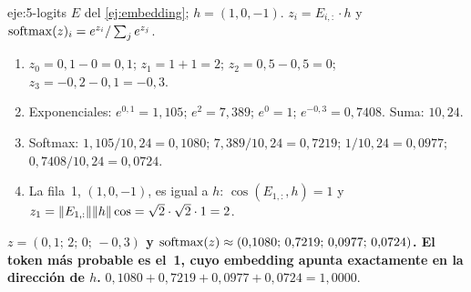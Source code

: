 \begin{solucion}{eje:5-logits}
\datos $E$ del \cref{ej:embedding}; $h=(1,0,-1)$.
\planteamiento $z_i=E_{i,:}\cdot h$ y $\operatorname{softmax}(z)_i=e^{z_i}/\sum_je^{z_j}$.
\pasos
\begin{enumerate}[label=\arabic*.]
  \item $z_0=0{,}1-0=0{,}1$; $z_1=1+1=2$; $z_2=0{,}5-0{,}5=0$; $z_3=-0{,}2-0{,}1=-0{,}3$.
  \item Exponenciales: $e^{0{,}1}=1{,}105$; $e^{2}=7{,}389$; $e^{0}=1$; $e^{-0{,}3}=0{,}7408$. Suma: $10{,}24$.
  \item Softmax: $1{,}105/10{,}24=0{,}1080$; $7{,}389/10{,}24=0{,}7219$; $1/10{,}24=0{,}0977$; $0{,}7408/10{,}24=0{,}0724$.
  \item La fila~1, $(1,0,-1)$, es igual a $h$: $\cos(E_{1,:},h)=1$ y $z_1=\lVert E_{1,:}\rVert\lVert h\rVert\cos=\sqrt2\cdot\sqrt2\cdot 1=2$.
\end{enumerate}
\resultado \textbf{$z=(0{,}1;\,2;\,0;\,-0{,}3)$ y $\operatorname{softmax}(z)\approx(0{,}1080;\,0{,}7219;\,0{,}0977;\,0{,}0724)$. El token más probable es el~1, cuyo embedding apunta exactamente en la dirección de $h$.}
\comprobacion $0{,}1080+0{,}7219+0{,}0977+0{,}0724=1{,}0000$.
\end{solucion}

